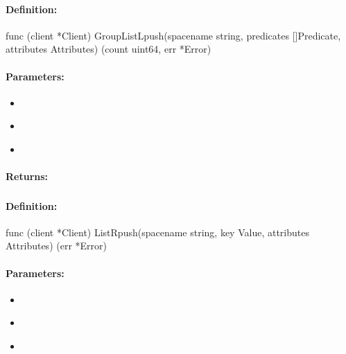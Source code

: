 \paragraph{Definition:}
\begin{gocode}
func (client *Client) GroupListLpush(spacename string, predicates []Predicate, attributes Attributes) (count uint64, err *Error)
\end{gocode}

\paragraph{Parameters:}
\begin{itemize}[noitemsep]
\item {}\\

\item {}\\

\item {}\\

\end{itemize}

\paragraph{Returns:}


\pagebreak
\subsubsection{}
\label{api:Go:ListRpush}


\paragraph{Definition:}
\begin{gocode}
func (client *Client) ListRpush(spacename string, key Value, attributes Attributes) (err *Error)
\end{gocode}

\paragraph{Parameters:}
\begin{itemize}[noitemsep]
\item {}\\

\item {}\\

\item {}\\

\end{itemize}

